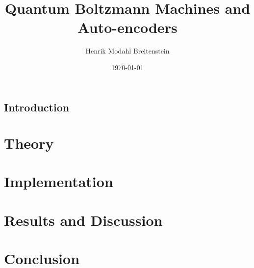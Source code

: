 \documentclass[a4paper]{report}
\begin{document}
\title{Quantum Boltzmann Machines and Auto-encoders}
\author{Henrik Modahl Breitenstein}
\date{\today}
\maketitle



\tableofcontents

\chapter{Introduction}


\part{Theory}


\part{Implementation}


\part{Results and Discussion}


\part{Conclusion}



\end{document}
